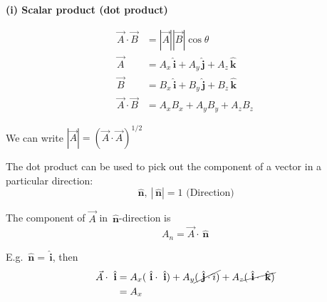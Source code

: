 \documentclass[twoside]{scrartcl}
\let\oldhat\hat
\renewcommand{\hat}[1]{\,\oldhat{\boldsymbol{\mathbf{#1}}}}
\begin{document}
\textbf{(i) Scalar product (dot product)}

\begin{center}
  \end{center}

\[\begin{aligned}
\vec{A} \cdot \vec{B} &= |\vec{A}||\vec{B}|\cos \theta\\
\vec{A} &= A_x\hat{i} + A_y\hat{j} + A_z\hat{k}\\
\vec{B} &= B_x\hat{i} + B_y\hat{j} + B_z\hat{k}\\
\vec{A}\cdot \vec{B} &= A_xB_x + A_yB_y + A_zB_z
\end{aligned}
\]

We can write $|\vec{A}| = (\vec{A}\cdot\vec{A})^{1/2}$

The dot product can be used to pick out the component of a vector in a particular direction:
\[\hat{n},~|\hat{n}| = 1 \text{ (Direction)}\]

The component of $\vec{A}$ in $\hat{n}$-direction is 
\[A_n = \vec{A}\cdot\hat{n}\]

E.g. $\hat{n} = \hat{i}$, then 
\[\begin{aligned}
\vec{A}\cdot\hat{i} &= A_x(\hat{i}\cdot\hat{i}) + A_y\cancel{(\hat{j}\cdot{i})} + A_z\cancel{(\hat{i} \cdot\hat{k})}\\
&= A_x
\end{aligned}
\]~
\end{document}
